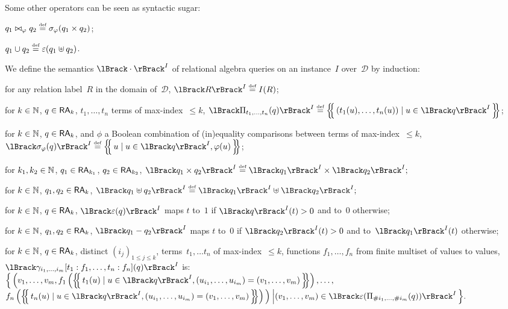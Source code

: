 Some other operators can be seen as syntactic sugar:
\begin{inparadesc}
	\item[join] $q_1\bowtie_\varphi q_2 \overset{\text{\tiny def}}{=} \sigma_\varphi(q_1\times q_2)$;
	\item[set union] $q_1\cup q_2\overset{\text{\tiny def}}{=} \varepsilon(q_1\uplus q_2)$.
\end{inparadesc}

\begin{toappendix}
We define the semantics $\sem{I}{\cdot}$ of relational algebra
queries on an instance~$I$ over~$\mathcal{D}$ by induction:
\begin{compactdesc}
	\item[relation] for any relation label~$R$ in the domain of~$\mathcal{D}$,
	$\sem{I}{ R}\defeq I(R)$;
	\item[projection] for $k\in\mathbb{N}$, $q\in\mathsf{RA}_{k}$,
	$t_1,\dots, t_n$ terms of max-index~\mbox{$\leq k$},
	$\sem{I}{\Pi_{t_1,\dots,t_n}(q)}\defeq
		\mset{(t_1(u),\dots,t_n(u))\mid u\in\sem{I}{ q}}
	$;
	\item[selection] for $k\in\mathbb{N}$, $q\in\mathsf{RA}_k$, and $\phi$ a
	Boolean combination of (in)equality comparisons between terms
	of max-index~$\leq k$,
	$\sem{I}{\sigma_\phi(q)}\defeq
		\mset{u\mid u\in\sem{I}{ q}, \phi(u)}$;
	\item[cross product] for $k_1,k_2\in\mathbb{N}$, $q_1\in\mathsf{RA}_{k_1}$,
	$q_2\in\mathsf{RA}_{k_2}$, \(\sem{I}{ q_1\times q_2} \defeq
	\sem{I}{q_1}\times\sem{I}{q_2};\)
	\item[multiset sum] for $k\in\mathbb{N}$, $q_1,q_2\in\mathsf{RA}_k$,
	\(\sem{I}{ q_1\uplus q_2}\defeq\sem{I}{ q_1}\uplus\sem{I}{ q_2};\)
	\item[duplicate elimination] for $k\in\mathbb{N}$,
	$q\in\mathsf{RA}_k$,
	\(
	\sem{I}{\epsilon(q)}\) maps $t$ to~$1$
	if $\sem Iq(t)>0$ and to~$0$ otherwise;
	\item[multiset difference]
	for $k\in\mathbb{N}$, $q_1,q_2\in\mathsf{RA}_k$,
	$\sem{I}{q_1-q_2}$
	maps $t$ to~$0$ if
	$\sem{I}{q_2}(t)>0$ and to~$\sem{I}{q_1}(t)$ otherwise;
	\item[aggregation] for $k\in\mathbb{N}$,
	$q\in\mathsf{RA}_k$, distinct $(i_j)_{1\leq j\leq k}$,
	terms~$t_1,\dots t_n$
	of max-index~$\leq k$, functions $f_1,\dots,f_n$ from finite multiset of values to
	values,
	\(\sem{I}{\gamma_{i_1,\dots,i_m}
		[t_1:f_1,\dots,t_n:f_n](q)}\) is:\\
    \(
	\Big\{\,
	\Big(v_1,\dots,v_m,                f_1\left(\mset{t_1(u)\mid u\in \sem{I}{q},
	(u_{i_1},\dots,u_{i_m})=(v_1,\dots,v_m)}\right),
  \dots,\)\\{}\qquad
	\(f_n\left(\mset{t_n(u)\mid
	u\in
	\sem{I}{q},
	(u_{i_1},\dots,u_{i_m})=(v_1,\dots,v_m)}\right)\Big)
	\:\Big|
	(v_1,\dots,v_m)\in\sem{I}{\epsilon(\Pi_{\#i_1,\dots,\#i_m}(q))}
	\,\Big\}.
	\)
  \bigskip
\end{compactdesc}
\end{toappendix}

